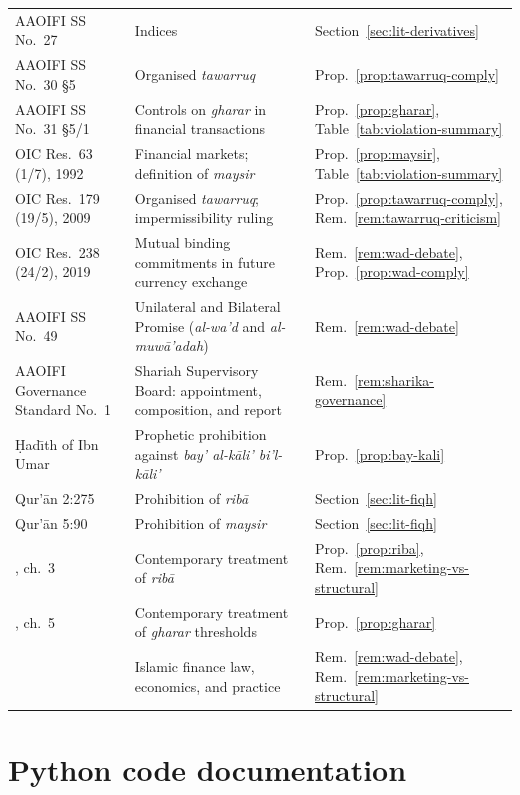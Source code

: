 \documentclass[preprint,12pt,authoryear]{elsarticle}
\theoremstyle{definition}
\begin{document}
\begin{table}[!p]
\begin{tabular}{@{}p{4.3cm}p{4.3cm}p{4.3cm}@{}}
AAOIFI SS No.~27
    & Indices
    & Section~\ref{sec:lit-derivatives} \\
AAOIFI SS No.~30 \S5
    & Organised \emph{tawarruq}
    & Prop.~\ref{prop:tawarruq-comply} \\
AAOIFI SS No.~31 \S5/1
    & Controls on \emph{gharar} in financial transactions
    & Prop.~\ref{prop:gharar},
      Table~\ref{tab:violation-summary} \\
OIC Res.~63 (1/7), 1992
    & Financial markets; definition of \emph{maysir}
    & Prop.~\ref{prop:maysir},
      Table~\ref{tab:violation-summary} \\
OIC Res.~179 (19/5), 2009
    & Organised \emph{tawarruq}; impermissibility ruling
    & Prop.~\ref{prop:tawarruq-comply},
      Rem.~\ref{rem:tawarruq-criticism} \\
OIC Res.~238 (24/2), 2019
    & Mutual binding commitments in future currency exchange
    & Rem.~\ref{rem:wad-debate},
      Prop.~\ref{prop:wad-comply} \\
AAOIFI SS No.~49
    & Unilateral and Bilateral Promise
      (\emph{al-wa'd} and \emph{al-muw\={a}'adah})
    & Rem.~\ref{rem:wad-debate} \\
AAOIFI Governance
    Standard No.~1
    & Shariah Supervisory Board: appointment, composition, and
      report
    & Rem.~\ref{rem:sharika-governance} \\
\d{H}ad\={\i}th of Ibn Umar
    & Prophetic prohibition against
      \emph{bay' al-k\={a}li' bi'l-k\={a}li'}
    & Prop.~\ref{prop:bay-kali} \\
Qur'\={a}n 2:275
    & Prohibition of \emph{rib\={a}}
    & Section~\ref{sec:lit-fiqh} \\
Qur'\={a}n 5:90
    & Prohibition of \emph{maysir}
    & Section~\ref{sec:lit-fiqh} \\
\citet{Usmani2002}, ch.~3
    & Contemporary treatment of \emph{rib\={a}}
    & Prop.~\ref{prop:riba},
      Rem.~\ref{rem:marketing-vs-structural} \\
\citet{Kamali2000}, ch.~5
    & Contemporary treatment of \emph{gharar} thresholds
    & Prop.~\ref{prop:gharar} \\
\citet{ElGamal2006}
    & Islamic finance law, economics, and practice
    & Rem.~\ref{rem:wad-debate},
      Rem.~\ref{rem:marketing-vs-structural} \\
\bottomrule
\end{tabular}
\end{table}

\section{Python code documentation}
\label{app:code-doc}
\end{document}
